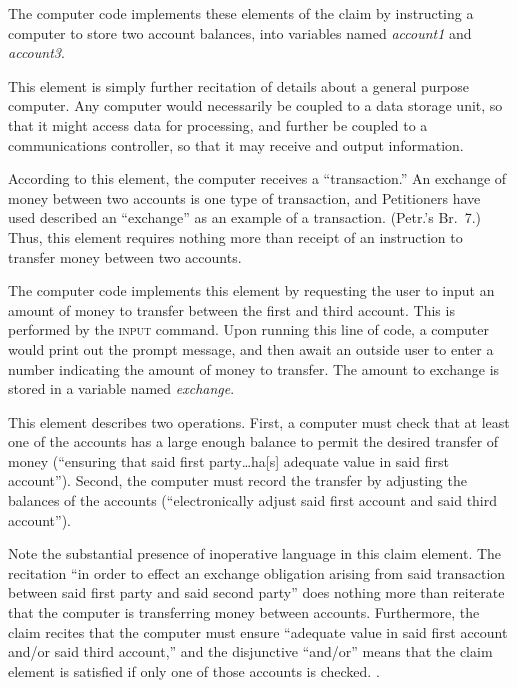 \documentclass{scotus}
\begin{document}
The computer code implements these elements of the claim by instructing a
computer to store two account balances, into variables named \emph{account1} and
\emph{account3}.


This element is simply further recitation of details about a general purpose
computer. Any computer would necessarily be coupled to a data storage unit, so
that it might access data for processing, and further be coupled to a
communications controller, so that it may receive and output information.


According to this element, the computer receives a ``transaction.'' An exchange
of money between two accounts is one type of transaction, and Petitioners have
used described an ``exchange'' as an example of a transaction. (Petr.'s Br.\ 7.)
Thus, this
element requires nothing more than receipt of an instruction to transfer money
between two accounts.

The computer code implements this element by requesting the user to input an
amount of money to
transfer between the first and third account. This is performed by the
\textsc{input} command. Upon running this line of code,
a computer would print out the prompt message, and then await an outside user to
enter a number indicating the amount of money to transfer. The amount to
exchange is stored in a variable named \emph{exchange}.


This element describes two operations. First, a computer must check that at
least one of the accounts has a large enough balance to permit the desired
transfer of money (``ensuring that said first party\ldots ha[s] adequate value
in
said first account''). Second, the computer must record the transfer by
adjusting the balances of the accounts (``electronically adjust said first
account and said third account'').

Note the substantial presence of inoperative language in this claim element. The
recitation ``in order to effect an exchange obligation arising from said
transaction between said first party and said second party'' does nothing more
than reiterate that the computer is transferring money between accounts.
Furthermore, the claim recites that the computer must ensure ``adequate value in
said first account and/or said third account,'' and the disjunctive ``and/or''
means that the claim element is satisfied if only one of those accounts is
checked. .
\end{document}
